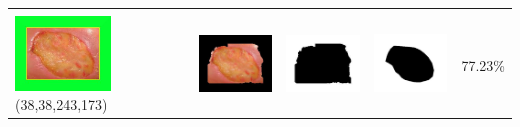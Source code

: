 \begin{table}[H]
\begin{tabular}{|m{1.0in}|m{1.0in}|m{1.0in}|m{1.0in}|m{0.6in}|}
		&  &  & \\
		\includegraphics[width=1.0in]{gambar/hasil_segmentasi/luka_kuning/image_16_rect.jpg} {\centering\fontsize{10}{10}\selectfont(38,38,243,173)}&
		\includegraphics[width=1.0in]{gambar/hasil_segmentasi/luka_kuning/result_16.jpg}&
		\includegraphics[width=1.0in]{gambar/hasil_segmentasi/luka_kuning/mask_r_16.jpg}&
		\includegraphics[width=1.0in]{gambar/hasil_segmentasi/luka_kuning/16_r.jpg}&
		77.23\% \\
		\hline
	\end{tabular}
\end{table}


